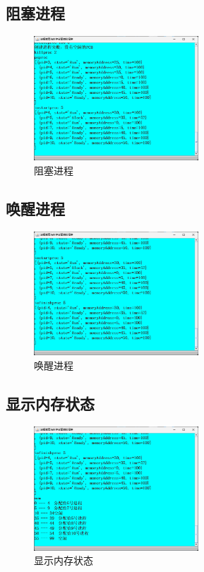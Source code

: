 \documentclass[UTF8,12pt]{article}
\begin{document}
\newpage

\subsection{阻塞进程}
\begin{figure}[htbp]
    \centering
    \includegraphics[width=0.55\textwidth]{img/5.png}
    \caption{阻塞进程}
\end{figure}

\subsection{唤醒进程}
\begin{figure}[htbp]
    \centering
    \includegraphics[width=0.55\textwidth]{img/6.png}
    \caption{唤醒进程}
\end{figure}

\newpage

\subsection{显示内存状态}
\begin{figure}[htbp]
    \centering
    \includegraphics[width=0.55\textwidth]{img/7.png}
    \caption{显示内存状态}
\end{figure}
\end{document}
